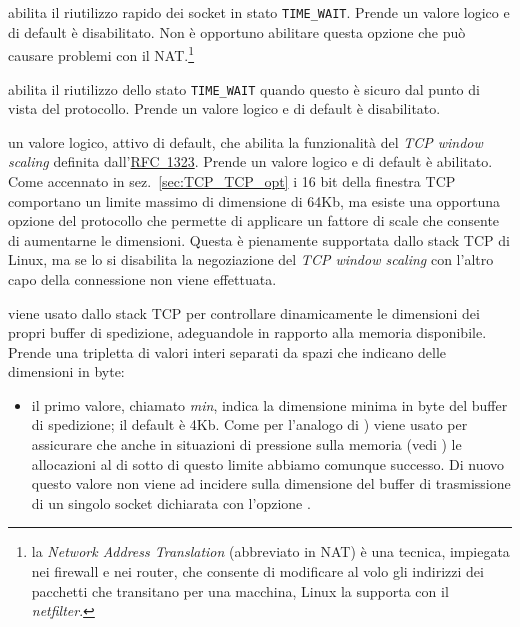 \begin{basedescript}{\desclabelwidth{2.2cm}\desclabelstyle{\nextlinelabel}}
\item[\sysctlrelfiled{net/ipv4}{tcp\_tw\_recycle}] abilita il riutilizzo
  rapido dei socket in stato \texttt{TIME\_WAIT}. Prende un valore logico e di
  default è disabilitato. Non è opportuno abilitare questa opzione che può
  causare problemi con il NAT.\footnote{la
     \textit{Network Address
      Translation} (abbreviato in NAT) è una tecnica, impiegata nei firewall e
    nei router, che consente di modificare al volo gli indirizzi dei pacchetti
    che transitano per una macchina, Linux la supporta con il
    \textit{netfilter}.}

\item[\sysctlrelfiled{net/ipv4}{tcp\_tw\_reuse}] abilita il riutilizzo
  dello stato \texttt{TIME\_WAIT} quando questo è sicuro dal punto di vista
  del protocollo. Prende un valore logico e di default è disabilitato. 

\item[\sysctlrelfiled{net/ipv4}{tcp\_window\_scaling}] un valore
  logico, attivo di default, che abilita la funzionalità del
   \textit{TCP window scaling} definita
  dall'\href{http://www.ietf.org/rfc/rfc1323.txt}{RFC~1323}. Prende un valore
  logico e di default è abilitato. Come accennato in
  sez.~\ref{sec:TCP_TCP_opt} i 16 bit della finestra TCP comportano un limite
  massimo di dimensione di 64Kb, ma esiste una opportuna opzione del
  protocollo che permette di applicare un fattore di scale che consente di
  aumentarne le dimensioni. Questa è pienamente supportata dallo stack TCP di
  Linux, ma se lo si disabilita la negoziazione del
   \textit{TCP window scaling} con l'altro capo
  della connessione non viene effettuata.



\item[\sysctlrelfiled{net/ipv4}{tcp\_wmem}] viene usato dallo stack TCP
  per controllare dinamicamente le dimensioni dei propri buffer di spedizione,
  adeguandole in rapporto alla memoria disponibile.  Prende una tripletta di
  valori interi separati da spazi che indicano delle dimensioni in byte:

  \begin{itemize}
  \item il primo valore, chiamato \textit{min}, indica la dimensione minima in
    byte del buffer di spedizione; il default è 4Kb. Come per l'analogo di
    ) viene usato per assicurare
    che anche in situazioni di pressione sulla memoria (vedi
    ) le allocazioni al di sotto di
    questo limite abbiamo comunque successo.  Di nuovo questo valore non viene
    ad incidere sulla dimensione del buffer di trasmissione di un singolo
    socket dichiarata con l'opzione .


\end{itemize}
\end{basedescript}
